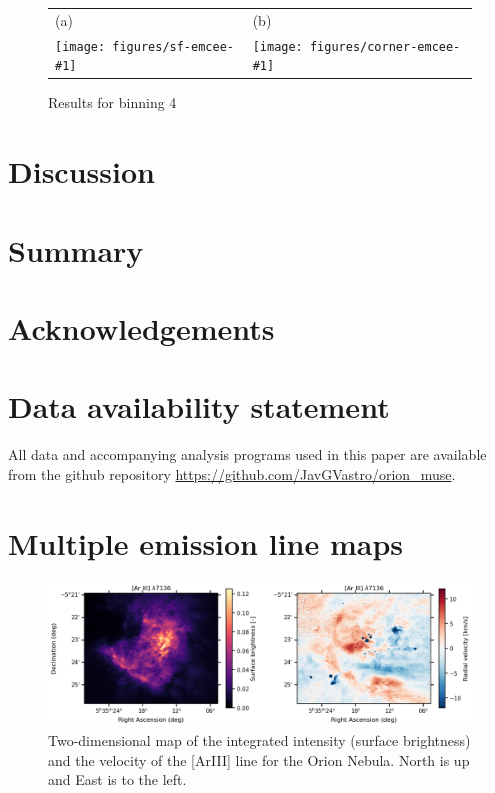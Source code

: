 \documentclass[fleqn,usenatbib, useAMS, a4paper]{mnras}
\makeatletter
\newcommand\SFtwograph[2]{%
  \texttt{[image: figures/sf-emcee-\#1]}
  &  \texttt{[image: figures/corner-emcee-\#1]}
}
\newcommand\sffigg[2]{%
  \begin{tabular}{@{}ll@{}}
    (a)& (b)\\
    \SFtwograph{#1}{#2}
  \end{tabular}%
}
\makeatother
\begin{document}
\begin{figure}
  \centering
  \sffigg{S_III-9069_mask_bin_4}{S_III-9069_mask_bin_4}
  \caption{ Results for binning 4
  }
  \label{fig:Orion_sf_S}
\end{figure}

\section{Discussion}\label{sec:discussion}






\section{Summary}\label{sec:summary}


\section*{Acknowledgements}

\section*{Data availability statement}
\label{sec:data-avail-stat}
All data and accompanying analysis programs used in this paper are available
from the github repository \url{https://github.com/JavGVastro/orion_muse}.







\appendix

\section{Multiple emission line maps} \label{apex:multiple_lines_maps}

\begin{figure}
 \centering
 \includegraphics[width=6.5in]{figures/Ar_III-7136.png}\par
 \caption{
 Two-dimensional map of the integrated intensity (surface brightness) and the  velocity of the [ArIII] line for the Orion Nebula. 
 North is up and East is to the left.
 }
\label{fig:Ar_maps}
\end{figure}
\end{document}
